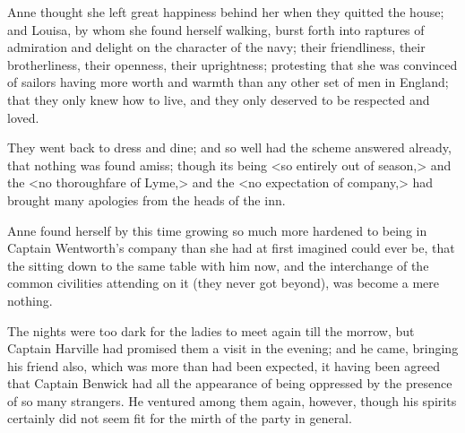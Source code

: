 Anne thought she left great happiness behind her when they quitted the house; and Louisa, by whom she found herself walking, burst forth into raptures of admiration and delight on the character of the navy; their friendliness, their brotherliness, their openness, their uprightness; protesting that she was convinced of sailors having more worth and warmth than any other set of men in England; that they only knew how to live, and they only deserved to be respected and loved.

They went back to dress and dine; and so well had the scheme answered already, that nothing was found amiss; though its being <so entirely out of season,> and the <no thoroughfare of Lyme,> and the <no expectation of company,> had brought many apologies from the heads of the inn.

Anne found herself by this time growing so much more hardened to being in Captain Wentworth's company than she had at first imagined could ever be, that the sitting down to the same table with him now, and the interchange of the common civilities attending on it (they never got beyond), was become a mere nothing.

The nights were too dark for the ladies to meet again till the morrow, but Captain Harville had promised them a visit in the evening; and he came, bringing his friend also, which was more than had been expected, it having been agreed that Captain Benwick had all the appearance of being oppressed by the presence of so many strangers. He ventured among them again, however, though his spirits certainly did not seem fit for the mirth of the party in general.

